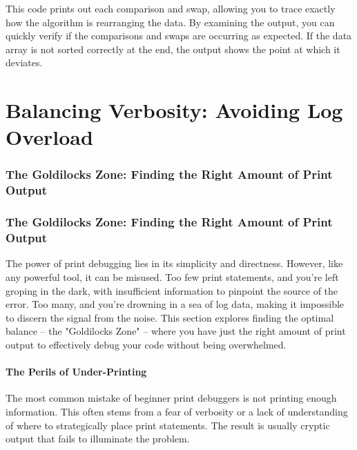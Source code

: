 \documentclass{article}
\begin{document}
{{{This code prints out each comparison and swap, allowing you to trace exactly how the algorithm is rearranging the data. By examining the output, you can quickly verify if the comparisons and swaps are occurring as expected. If the data array is not sorted correctly at the end, the output shows the point at which it deviates.


\part*{Balancing Verbosity: Avoiding Log Overload} %
\label{part-4-Balancing_Verbosity__Avoiding_Log_Overlo}


\section*{The Goldilocks Zone: Finding the Right Amount of Print Output} %
\label{chapter-4-1-The_Goldilocks_Zone__Finding_the_Right_A}

\section*{The Goldilocks Zone: Finding the Right Amount of Print Output}

The power of print debugging lies in its simplicity and directness. However, like any powerful tool, it can be misused. Too few print statements, and you're left groping in the dark, with insufficient information to pinpoint the source of the error. Too many, and you're drowning in a sea of log data, making it impossible to discern the signal from the noise.  This section explores finding the optimal balance – the "Goldilocks Zone" – where you have just the right amount of print output to effectively debug your code without being overwhelmed.

\subsection*{The Perils of Under-Printing}

The most common mistake of beginner print debuggers is not printing enough information. This often stems from a fear of verbosity or a lack of understanding of where to strategically place print statements. The result is usually cryptic output that fails to illuminate the problem.

}}}
\end{document}
